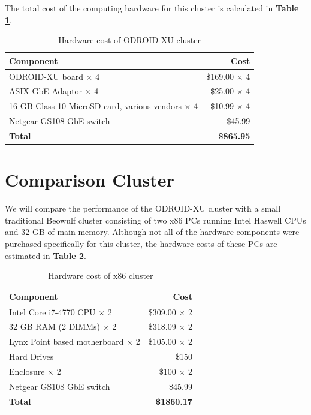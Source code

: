 \documentclass[11pt]{book}
\begin{document}
The total cost of the computing hardware for this cluster is calculated in
\textbf{Table \ref{xu-cost-table}}.

\begin{table}
  \caption{Hardware cost of ODROID-XU cluster}
  \label{xu-cost-table}
  \centering
  \begin{tabular}{| l | r |}
    \hline
    \textbf{Component} & \textbf{Cost} \\ \hline
    ODROID-XU board $\times$ 4 & \$169.00 $\times$ 4 \\
    ASIX GbE Adaptor $\times$ 4 & \$25.00 $\times$ 4 \\
    16 GB Class 10 MicroSD card, various vendors $\times$ 4 & \$10.99 $\times$ 4 \\
    Netgear GS108 GbE switch & \$45.99 \\
    \hline
    \textbf{Total} & \textbf{\$865.95} \\ \hline
  \end{tabular}
\end{table}

\section{\textbf{Comparison Cluster}}

We will compare the performance of the ODROID-XU cluster with a small
traditional Beowulf cluster consisting of two x86 PCs running Intel Haswell CPUs
and 32 GB of main memory. Although not all of the hardware components were
purchased specifically for this cluster, the hardware costs of these PCs are
estimated in \textbf{Table \ref{x86-cost-table}}.

\begin{table}
  \caption{Hardware cost of x86 cluster}
  \label{x86-cost-table}
  \centering
  \begin{tabular}{| l | r |}
    \hline
    \textbf{Component} & \textbf{Cost} \\
    \hline
    Intel Core i7-4770 CPU $\times$ 2 & \$309.00 $\times$ 2 \\
    32 GB RAM (2 DIMMs) $\times$ 2 & \$318.09 $\times$ 2 \\
    Lynx Point based motherboard $\times$ 2 & \$105.00 $\times$ 2 \\
    Hard Drives & \$150 \\
    Enclosure $\times$ 2 & \$100 $\times$ 2 \\
    Netgear GS108 GbE switch & \$45.99 \\
    \hline
    \textbf{Total} & \textbf{\$1860.17} \\ \hline
  \end{tabular}
\end{table}
\end{document}
